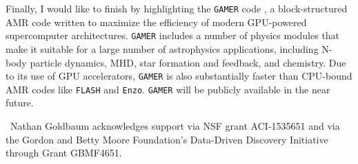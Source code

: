 \documentclass[11pt,twoside]{article}
\begin{document}
Finally, I would like to finish by highlighting the \texttt{GAMER} code \citep{schive2010}, a block-structured AMR code written to maximize the efficiency of modern GPU-powered supercomputer architectures. \texttt{GAMER} includes a number of physics modules that make it suitable for a large number of astrophysics applications, including N-body particle dynamics, MHD, star formation and feedback, and chemistry. Due to its use of GPU accelerators, \texttt{GAMER} is also substantially faster than CPU-bound AMR codes like \texttt{FLASH} and \texttt{Enzo}. \texttt{GAMER} will be publicly available in the near future.

\acknowledgements\ Nathan Goldbaum acknowledges support via NSF grant ACI-1535651 and via the Gordon and Betty Moore Foundation's Data-Driven Discovery Initiative through Grant GBMF4651.


\end{document}
